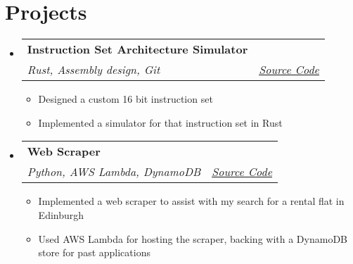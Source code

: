 \documentclass[a4paper,11pt]{article}
\makeatletter
\newcommand{\resumeItem}[1]{
  \item\small{#1}
}
\newcommand{\resumeItemListStart}{\begin{itemize}[rightmargin=0.11in]}
\newcommand{\resumeItemListEnd}{\end{itemize}}
\newcommand{\resumeQuadHeading}[4]{
  \item
  \begin{tabular*}{0.96\textwidth}[t]{l@{\extracolsep{\fill}}r}
    \textbf{#1} & #2 \\
    \textit{\small#3} & \textit{\small #4} \\
  \end{tabular*}
}
\newcommand{\resumeHeadingListStart}{
  \begin{itemize}[leftmargin=0.15in, label={}]
}
\newcommand{\resumeHeadingListEnd}{\end{itemize}}
\makeatother
\begin{document}

\section{Projects}
  \resumeHeadingListStart{}
    \resumeQuadHeading{Instruction Set Architecture Simulator}{}
    {Rust, Assembly design, Git}{\href{https://github.com/TomLonergan03/isa}{\uline{Source Code}}}
      \resumeItemListStart{}
        \resumeItem{Designed a custom 16 bit instruction set}
        \resumeItem{Implemented a simulator for that instruction set in Rust}
      \resumeItemListEnd{}
    \resumeQuadHeading{Web Scraper}{}{Python, AWS Lambda, DynamoDB}{\href{https://github.com/TomLonergan03/rental-bot}{\uline{Source Code}}}
      \resumeItemListStart{}
        \resumeItem{Implemented a web scraper to assist with my search for a rental flat in Edinburgh}
        \resumeItem{Used AWS Lambda for hosting the scraper, backing with a DynamoDB store for past applications}
      \resumeItemListEnd{}
  \resumeHeadingListEnd{}



\end{document}
